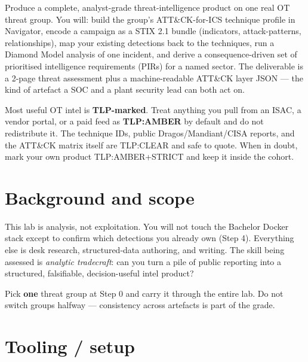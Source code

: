 \documentclass[11pt,a4paper]{article}
\begin{document}
\labheader

\begin{goalbox}
Produce a complete, analyst-grade threat-intelligence product on one real OT
threat group. You will: build the group's ATT\&CK-for-ICS technique profile in
Navigator, encode a campaign as a STIX 2.1 bundle (indicators, attack-patterns,
relationships), map your existing detections back to the techniques, run a
Diamond Model analysis of one incident, and derive a consequence-driven set of
prioritised intelligence requirements (PIRs) for a named sector. The
deliverable is a 2-page threat assessment plus a machine-readable ATT\&CK layer
JSON --- the kind of artefact a SOC and a plant security lead can both act on.
\end{goalbox}

\begin{warnbox}
Most useful OT intel is \textbf{TLP-marked}. Treat anything you pull from an
ISAC, a vendor portal, or a paid feed as \textbf{TLP:AMBER} by default and do
not redistribute it. The technique IDs, public Dragos/Mandiant/CISA reports,
and the ATT\&CK matrix itself are TLP:CLEAR and safe to quote. When in doubt,
mark your own product TLP:AMBER+STRICT and keep it inside the cohort.
\end{warnbox}

\section*{Background and scope}

This lab is analysis, not exploitation. You will not touch the Bachelor Docker
stack except to confirm which detections you already own (Step 4). Everything
else is desk research, structured-data authoring, and writing. The skill being
assessed is \emph{analytic tradecraft}: can you turn a pile of public reporting
into a structured, falsifiable, decision-useful intel product?

Pick \textbf{one} threat group at Step 0 and carry it through the entire lab.
Do not switch groups halfway --- consistency across artefacts is part of the grade.

\section*{Tooling / setup}
\end{document}
